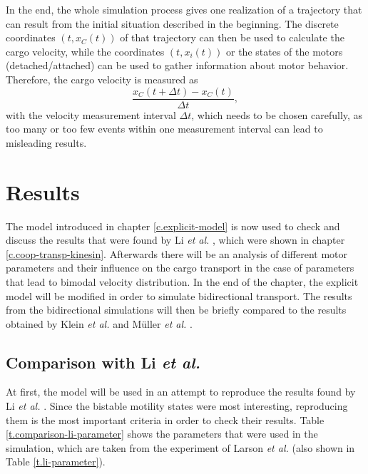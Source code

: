 In the end, the whole simulation process gives one realization of a trajectory that can result from the initial situation described in the beginning. The discrete coordinates
\mbox{$\left(t, x_C\left(t\right)\right)$} of that trajectory can then be used to calculate the cargo velocity, while the coordinates \mbox{$\left(t, x_i\left(t\right)\right)$} or the
states of the motors (detached/attached) can be used to gather information about motor behavior. Therefore, the cargo velocity is measured as
\begin{equation}\label{e.cargo-vel-measurement}
 \dfrac{x_C\left(t + \Delta t\right) - x_C\left(t\right)}{\Delta t},
\end{equation}
with the velocity measurement interval $\Delta t$, which needs to be chosen carefully, as too many or too few events within one measurement interval can lead to misleading results.





\chapter{Results}\label{c.results}
The model introduced in chapter \ref{c.explicit-model} is now used to check and discuss the results that were found by Li \textit{et al.} \cite{li}, which were shown in chapter
\ref{c.coop-transp-kinesin}. Afterwards there will be an analysis of different motor parameters and their influence on the cargo transport in the case of parameters that lead to bimodal
velocity distribution. In the end of the chapter, the explicit model will be modified in order to simulate bidirectional transport. The results from the bidirectional simulations will then be
briefly compared to the results obtained by Klein \textit{et al.} \cite{sklein} and Müller \textit{et al.} \cite{pnas105}.

\section{Comparison with Li \textit{et al.}}\label{s.comparison-with-li-et-al}
At first, the model will be used in an attempt to reproduce the results found by Li \textit{et al.} \cite{li}. Since the bistable motility states were most interesting, reproducing them is the most
important criteria in order to check their results. Table \ref{t.comparison-li-parameter} shows the parameters that were used in the simulation, which are taken from the experiment of Larson
\textit{et al.} \cite{larson} (also shown in Table \ref{t.li-parameter}).

